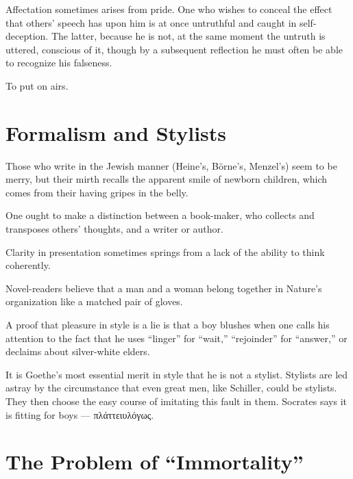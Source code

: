 \documentclass[12pt,a4paper]{article}
\newcommand{\aphsep}{\par\smallskip\centerline{\textasteriskcentered}\smallskip}
\begin{document}
\aphsep

Affectation sometimes arises from pride. One who wishes to conceal the effect that
others' speech has upon him is at once untruthful and caught in self-deception.
The latter, because he is not, at the same moment the untruth is uttered,
conscious of it, though by a subsequent reflection he must often be able to
recognize his falseness.

To put on airs.

\bigskip

\section*{Formalism and Stylists}
\label{ch:008}

Those who write in the Jewish manner (Heine's, Börne's, Menzel's) seem to be
merry, but their mirth recalls the apparent smile of newborn children, which comes
from their having gripes in the belly.

\aphsep

One ought to make a distinction between a book-maker, who collects and transposes
others' thoughts, and a writer or author.

\aphsep

Clarity in presentation sometimes springs from a lack of the ability to think
coherently.

\aphsep

Novel-readers believe that a man and a woman belong together in Nature's
organization like a matched pair of gloves.

\aphsep

A proof that pleasure in style is a lie is that a boy blushes when one calls his
attention to the fact that he uses ``linger'' for ``wait,'' ``rejoinder'' for
``answer,'' or declaims about silver-white elders.

\aphsep

It is Goethe's most essential merit in style that he is not a stylist. Stylists
are led astray by the circumstance that even great men, like Schiller, could be
stylists. They then choose the easy course of imitating this fault in them.
Socrates says it is fitting for boys --- πλάττειυλόγως.

\bigskip

\section*{The Problem of ``Immortality''}
\label{ch:009}
\end{document}
